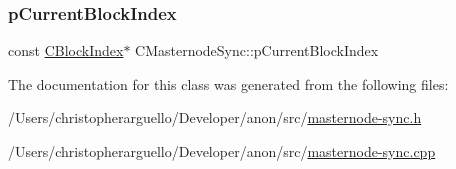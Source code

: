 \subsubsection{\texorpdfstring{p\+Current\+Block\+Index}{pCurrentBlockIndex}}
{\footnotesize\ttfamily const \mbox{\hyperlink{class_c_block_index}{C\+Block\+Index}}$\ast$ C\+Masternode\+Sync\+::p\+Current\+Block\+Index\hspace{0.3cm}{\ttfamily [private]}}



The documentation for this class was generated from the following files\+:\begin{DoxyCompactItemize}
\item 
/\+Users/christopherarguello/\+Developer/anon/src/\mbox{\hyperlink{masternode-sync_8h}{masternode-\/sync.\+h}}\item 
/\+Users/christopherarguello/\+Developer/anon/src/\mbox{\hyperlink{masternode-sync_8cpp}{masternode-\/sync.\+cpp}}\end{DoxyCompactItemize}
